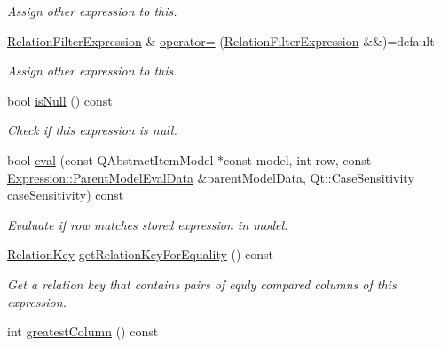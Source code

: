 \begin{DoxyCompactItemize}
\begin{DoxyCompactList}\small\item\em Assign other expression to this. \end{DoxyCompactList}\item 
\hyperlink{class_mdt_1_1_item_model_1_1_relation_filter_expression}{Relation\+Filter\+Expression} \& \hyperlink{class_mdt_1_1_item_model_1_1_relation_filter_expression_af08b89acec5eb3c9541aa33e87ee5787}{operator=} (\hyperlink{class_mdt_1_1_item_model_1_1_relation_filter_expression}{Relation\+Filter\+Expression} \&\&)=default\hypertarget{class_mdt_1_1_item_model_1_1_relation_filter_expression_af08b89acec5eb3c9541aa33e87ee5787}{}\label{class_mdt_1_1_item_model_1_1_relation_filter_expression_af08b89acec5eb3c9541aa33e87ee5787}

\begin{DoxyCompactList}\small\item\em Assign other expression to this. \end{DoxyCompactList}\item 
bool \hyperlink{class_mdt_1_1_item_model_1_1_relation_filter_expression_a087823f2bc6a47d7a552557f60993b67}{is\+Null} () const \hypertarget{class_mdt_1_1_item_model_1_1_relation_filter_expression_a087823f2bc6a47d7a552557f60993b67}{}\label{class_mdt_1_1_item_model_1_1_relation_filter_expression_a087823f2bc6a47d7a552557f60993b67}

\begin{DoxyCompactList}\small\item\em Check if this expression is null. \end{DoxyCompactList}\item 
bool \hyperlink{class_mdt_1_1_item_model_1_1_relation_filter_expression_a4b52afb99b104bf428ecc64d53416ae3}{eval} (const Q\+Abstract\+Item\+Model $\ast$const model, int row, const \hyperlink{class_mdt_1_1_item_model_1_1_expression_1_1_parent_model_eval_data}{Expression\+::\+Parent\+Model\+Eval\+Data} \&parent\+Model\+Data, Qt\+::\+Case\+Sensitivity case\+Sensitivity) const 
\begin{DoxyCompactList}\small\item\em Evaluate if row matches stored expression in model. \end{DoxyCompactList}\item 
\hyperlink{class_mdt_1_1_item_model_1_1_relation_key}{Relation\+Key} \hyperlink{class_mdt_1_1_item_model_1_1_relation_filter_expression_a70a412ea498411b36b3f32cbafed201f}{get\+Relation\+Key\+For\+Equality} () const 
\begin{DoxyCompactList}\small\item\em Get a relation key that contains pairs of equly compared columns of this expression. \end{DoxyCompactList}\item 
int \hyperlink{class_mdt_1_1_item_model_1_1_relation_filter_expression_aa4aee02bc01b399cd4c46df18bc6101f}{greatest\+Column} () const \hypertarget{class_mdt_1_1_item_model_1_1_relation_filter_expression_aa4aee02bc01b399cd4c46df18bc6101f}{}\label{class_mdt_1_1_item_model_1_1_relation_filter_expression_aa4aee02bc01b399cd4c46df18bc6101f}


\end{DoxyCompactItemize}
